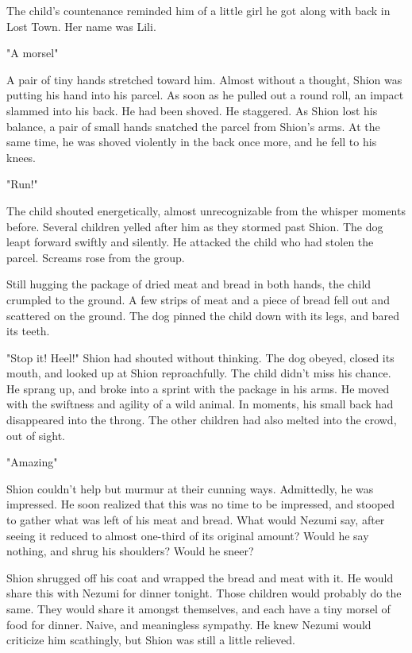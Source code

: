 The child's countenance reminded him of a little girl he got along with
back in Lost Town. Her name was Lili.

"A morsel\el "

A pair of tiny hands stretched toward him. Almost without a thought,
Shion was putting his hand into his parcel. As soon as he pulled out a
round roll, an impact slammed into his back. He had been shoved. He
staggered. As Shion lost his balance, a pair of small hands snatched the
parcel from Shion's arms. At the same time, he was shoved violently in
the back once more, and he fell to his knees.

"Run!"

The child shouted energetically, almost unrecognizable from the whisper
moments before. Several children yelled after him as they stormed past
Shion. The dog leapt forward swiftly and silently. He attacked the child
who had stolen the parcel. Screams rose from the group.

Still hugging the package of dried meat and bread in both hands, the
child crumpled to the ground. A few strips of meat and a piece of bread
fell out and scattered on the ground. The dog pinned the child down with
its legs, and bared its teeth.

"Stop it! Heel!" Shion had shouted without thinking. The dog obeyed,
closed its mouth, and looked up at Shion reproachfully. The child didn't
miss his chance. He sprang up, and broke into a sprint with the package
in his arms. He moved with the swiftness and agility of a wild animal.
In moments, his small back had disappeared into the throng. The other
children had also melted into the crowd, out of sight.

"Amazing\el "

Shion couldn't help but murmur at their cunning ways. Admittedly, he was
impressed. He soon realized that this was no time to be impressed, and
stooped to gather what was left of his meat and bread. What would Nezumi
say, after seeing it reduced to almost one-third of its original amount?
Would he say nothing, and shrug his shoulders? Would he sneer?

Shion shrugged off his coat and wrapped the bread and meat with it. He
would share this with Nezumi for dinner tonight. Those children would
probably do the same. They would share it amongst themselves, and each
have a tiny morsel of food for dinner. Naive, and meaningless sympathy.
He knew Nezumi would criticize him scathingly, but Shion was still a
little relieved.

